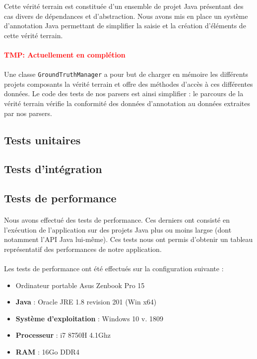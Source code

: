 \documentclass{scrartcl}
\begin{document}
    Cette vérité terrain est constituée d’un ensemble de projet Java présentant des cas divers de dépendances et d'abstraction. Nous avons mis en place un système d’annotation Java permettant de simplifier la saisie et la création d'éléments de cette vérité terrain.
    
    \paragraph{\textcolor{red}{TMP: Actuellement en complétion}}
    
    \paragraph{}Une classe \texttt{GroundTruthManager} a pour but de charger en mémoire les différents projets composants la vérité terrain et offre des méthodes d'accès à ces différentes données. Le code des tests de nos parsers est ainsi simplifier : le parcours de la vérité terrain vérifie la conformité des données d'annotation au données extraites par nos parsers.

\subsection{Tests unitaires}

\subsection{Tests d'intégration}

\subsection{Tests de performance}

    \paragraph{}Nous avons effectué des tests de performance. Ces derniers ont consisté en l’exécution de l’application sur des projets Java plus ou moins largse (dont notamment l'API Java lui-même). Ces tests nous ont permis d’obtenir un tableau représentatif des performances de notre application.

    \paragraph{}Les tests de performance ont été effectués sur la configuration suivante :
    \begin{itemize}
        \item Ordinateur portable Asus Zenbook Pro 15
        \item \textbf{Java} : Oracle JRE 1.8 revision 201 (Win x64)
        \item \textbf{Système d'exploitation} : Windows 10 v. 1809
        \item \textbf{Processeur} : i7 8750H 4.1Ghz
        \item \textbf{RAM} : 16Go DDR4
    \end{itemize}
    
\end{document}
